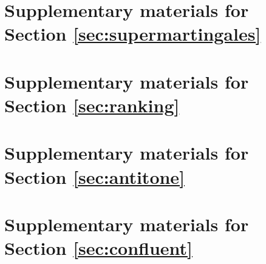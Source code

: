 \documentclass{msc}
\theoremstyle{definition}
\begin{document}



















\appendix

\section{Supplementary materials for Section \ref{sec:supermartingales}}



\section{Supplementary materials for Section \ref{sec:ranking}}



\section{Supplementary materials for Section \ref{sec:antitone}}



\section{Supplementary materials for Section \ref{sec:confluent}}




%

\end{document}
